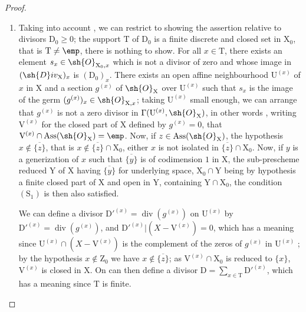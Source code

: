 \begin{proof}
\begin{enumerate}[label=(\roman*)]
  \item Taking into account , we can restrict to showing the assertion relative to divisors $\mathrm{D}_0\geq 0$;
the support $\mathrm{T}$ of $\mathrm{D}_0$ is a finite discrete and closed set in $\mathrm{X}_0$, that is $\mathrm{T}\neq\emp$, there is nothing to show.
For all $x\in\mathrm{T}$, there exists an element $s_x\in\sh{O}_{\mathrm{X}_0,x}$ which is not a divisor of zero and whose image in $(\sh{D}iv_\mathrm{X})_x$ is $(\mathrm{D}_0)_x$.
There exists an open affine neighbourhood $\mathrm{U}^{(x)}$ of $x$ in $\mathrm{X}$ and a section $g^{(x)}$ of $\sh{O}_\mathrm{X}$ over $\mathrm{U}^{(x)}$ such that $s_x$ is the image of the germ $(g^{(x)})_x\in\sh{O}_{\mathrm{X},x}$;
taking $\mathrm{U}^{(x)}$ small enough, we can arrange that $g^{(x)}$ is not a zero divisor in $\Gamma(\mathrm{U}^{(x)},\sh{O}_\mathrm{X})$, in other words , writing $\mathrm{V}^{(x)}$ for the closed part of $\mathrm{X}$ defined by $g^{(x)}=0$, that $\mathrm{V}^{(x)}\cap\operatorname{Ass}(\sh{O}_\mathrm{X})=\emp$.
Now, if $z\in\operatorname{Ass}(\sh{O}_\mathrm{X})$, the hypothesis $x\notin\overline{\{z\}}$, that is $x\notin\overline{\{z\}}\cap\mathrm{X}_0$, either $x$ is not isolated in $\overline{\{z\}}\cap\mathrm{X}_0$.
Now, if $y$ is a generization of $x$ such that $\overline{\{y\}}$ is of codimension $1$ in $\mathrm{X}$, the sub-prescheme reduced $\mathrm{Y}$ of $\mathrm{X}$ having $\overline{\{y\}}$ for underlying space, $\mathrm{X}_0\cap\mathrm{Y}$ being by hypothesis a finite closed part of $\mathrm{X}$ and open in $\mathrm{Y}$, containing $\mathrm{Y}\cap\mathrm{X}_0$, the condition $(\mathrm{S}_1)$ is then also satisfied.

We can define a divisor $\mathrm{D}'^{(x)}=\operatorname{div}(g^{(x)})$ on $\mathrm{U}^{(x)}$ by $\mathrm{D}'^{(x)}=\operatorname{div}(g^{(x)})$, and $\mathrm{D}'^{(x)}|(X-\mathrm{V}^{(x)})=0$, which has a meaning since $\mathrm{U}^{(x)}\cap(X-\mathrm{V}^{(x)})$ is the complement of the zeros of $g^{(x)}$ in $\mathrm{U}^{(x)}$ ;
by the hypothesis $x\notin\mathrm{Z}_0$ we have $x\notin\overline{\{z\}}$;
as $\mathrm{V}^{(x)}\cap\mathrm{X}_0$ is reduced to $\{x\}$, $\mathrm{V}^{(x)}$ is closed in $\mathrm{X}$.
On can then define a divisor $\mathrm{D}=\sum_{x\in\mathrm{T}}\mathrm{D}'^{(x)}$, which has a meaning since $\mathrm{T}$ is finite.



\end{enumerate}
\end{proof}
